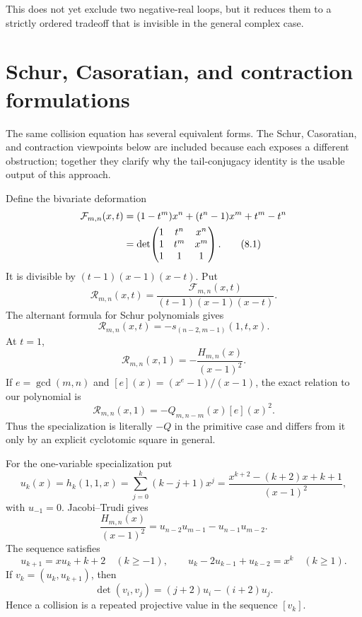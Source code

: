 \documentclass[11pt]{article}
\theoremstyle{definition}
\begin{document}
This does not yet exclude two negative-real loops, but it reduces them to a
strictly ordered tradeoff that is invisible in the general complex case.

\section{Schur, Casoratian, and contraction formulations}
\label{sec:schur}

The same collision equation has several equivalent forms.  The Schur, Casoratian, and contraction viewpoints below are included because each exposes a different obstruction; together they clarify why the tail-conjugacy identity is the usable output of this approach.

Define the bivariate deformation
\begin{align}
 \mathcal F_{m,n}(x,t)
 &=(1-t^m)x^n+(t^n-1)x^m+t^m-t^n  \notag\\
 &=\det\!\begin{pmatrix}
 1&t^n&x^n\\
 1&t^m&x^m\\
 1&1&1
 \end{pmatrix}.
 \tag{8.1}
\end{align}
It is divisible by \((t-1)(x-1)(x-t)\).  Put
\[
 \mathcal R_{m,n}(x,t)=
 \frac{\mathcal F_{m,n}(x,t)}{(t-1)(x-1)(x-t)}.
\]
The alternant formula for Schur polynomials gives
\begin{equation}
 \mathcal R_{m,n}(x,t)
 =-s_{(n-2,m-1)}(1,t,x).
 \tag{8.2}
\end{equation}
At \(t=1\),
\begin{equation}
 \mathcal R_{m,n}(x,1)
 =-\frac{H_{m,n}(x)}{(x-1)^2}.
 \tag{8.3}
\end{equation}
If \(e=\gcd(m,n)\) and \([e](x)=(x^e-1)/(x-1)\), the exact relation to our
polynomial is
\begin{equation}
 \mathcal R_{m,n}(x,1)
 =-Q_{m,n-m}(x)[e](x)^2.
 \tag{8.4}
\end{equation}
Thus the specialization is literally \(-Q\) in the primitive case and differs
from it only by an explicit cyclotomic square in general.

For the one-variable specialization put
\begin{equation}
 u_k(x)=h_k(1,1,x)
 =\sum_{j=0}^k(k-j+1)x^j
 =\frac{x^{k+2}-(k+2)x+k+1}{(x-1)^2},
 \tag{8.5}
\end{equation}
with \(u_{-1}=0\).  Jacobi--Trudi gives
\begin{equation}
 \frac{H_{m,n}(x)}{(x-1)^2}
 =u_{n-2}u_{m-1}-u_{n-1}u_{m-2}.
 \tag{8.6}
\end{equation}
The sequence satisfies
\begin{equation}
 u_{k+1}=xu_k+k+2\quad(k\geq-1),
 \qquad
 u_k-2u_{k-1}+u_{k-2}=x^k\quad(k\geq1).
 \tag{8.7}
\end{equation}
If \(v_k=(u_k,u_{k+1})\), then
\begin{equation}
 \det(v_i,v_j)=(j+2)u_i-(i+2)u_j.
 \tag{8.8}
\end{equation}
Hence a collision is a repeated projective value in the sequence \([v_k]\).
\end{document}
